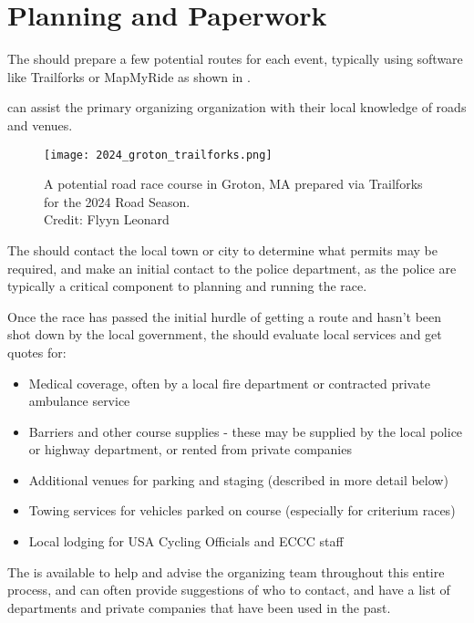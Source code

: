 \section{Planning and Paperwork}

The  should prepare a few potential routes for each event,
typically using software like Trailforks or MapMyRide as shown in .

 can assist the primary organizing organization with their local knowledge of roads and venues.

\begin{figure}[h]
  \texttt{[image: 2024\_groton\_trailforks.png]}
  \caption[Road race course map in Trailforks]{
    A potential road race course in Groton, MA
    prepared via Trailforks for the 2024 Road Season.\\
    Credit: Flyyn Leonard}
\end{figure}


The  should contact the local town or city
to determine what permits may be required, and make an initial contact to the police department,
as the police are typically a critical component to planning and running the race.

Once the race has passed the initial hurdle of getting a route and hasn't been shot down by the local government,
the  should evaluate local services and get quotes for:

\begin{itemize}
  \item Medical coverage, often by a local fire department or contracted private ambulance service
  \item Barriers and other course supplies - these may be supplied by the local police or highway department, or rented from private companies
  \item Additional venues for parking and staging (described in more detail below)
  \item Towing services for vehicles parked on course (especially for criterium races)
  \item Local lodging for USA Cycling Officials and ECCC staff %
\end{itemize}

The  is available to help and advise the organizing team throughout this entire process,
and can often provide suggestions of who to contact, and have a list of departments and private companies that have been used in the past.

